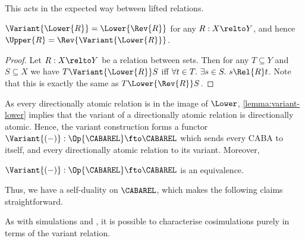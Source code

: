 This acts in the expected way between lifted relations.
\begin{lemma}
  \label{lemma:variant-lower}
  \(\Variant{\Lower{R}} = \Lower{\Rev{R}}\) for any \(R : X \relto Y\), and
  hence \(\Upper{R} = \Rev{\Variant{\Lower{R}}}\).
\end{lemma}
\begin{proof}
  Let \(R : X \relto Y\) be a relation between sets. Then for any
  \(T \subseteq Y\) and \(S \subseteq X\) we have \(T \Variant{\Lower{R}} S\)
  iff \(\forall t \in T.\ \exists s \in S.\ s \Rel{R} t\). Note that this is
  exactly the same as \(T \Lower{\Rev{R}} S\).
\end{proof}
As every directionally atomic relation is in the image of $\Lower$,
\cref{lemma:variant-lower} implies that the variant of a directionally atomic
relation is directionally atomic. Hence, the variant construction forms a
functor \(\Variant{(-)} : \Op{\CABAREL} \fto \CABAREL\) which sends every CABA
to itself, and every directionally atomic relation to its variant. Moreover,
\begin{theorem}
  \(\Variant{(-)} : \Op{\CABAREL} \fto \CABAREL\) is an equivalence.
\end{theorem}
Thus, we have a self-duality on $\CABAREL$, which makes the following
claims straightforward.

As with simulations and , it is possible to characterise
cosimulations purely in terms of the variant relation.

